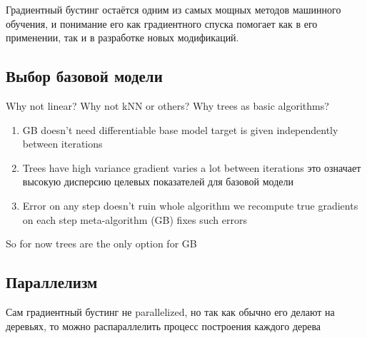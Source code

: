 Градиентный бустинг остаётся одним из самых мощных методов машинного обучения, и понимание его как градиентного спуска
помогает как в его применении, так и в разработке новых модификаций.

\subsection{Выбор базовой модели}

Why not linear?
Why not kNN or others?
Why trees as basic algorithms?
\begin{enumerate}
    \item GB doesn’t need differentiable base model
    \subitem target is given independently between iterations
    \item Trees have high variance
    \subitem gradient varies a lot between iterations
    \subitem это означает высокую дисперсию целевых показателей для базовой модели
    \item Error on any step doesn’t ruin whole algorithm
    \subitem we recompute true gradients on each step
    \subitem meta-algorithm (GB) fixes such errors
\end{enumerate}

So for now trees are the only option for GB

\subsection{Параллелизм}

Сам градиентный бустинг не parallelized, но так как обычно его делают на деревьях, то можно распараллелить процесс
построения каждого дерева